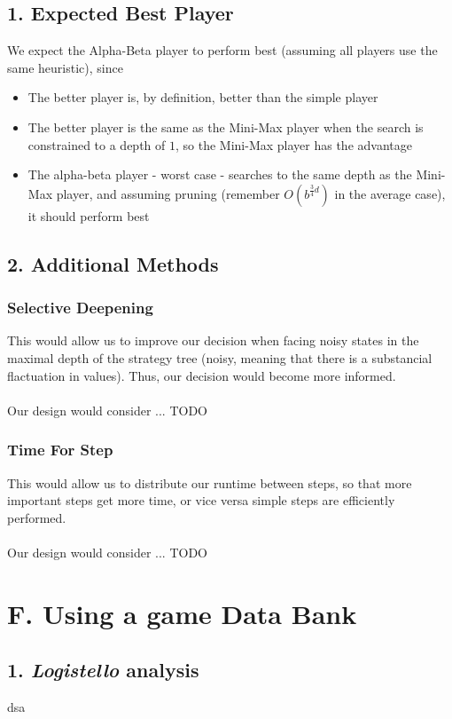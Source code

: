 \documentclass{article}
\begin{document}
\subsection*{1. Expected Best Player}
We expect the Alpha-Beta player to perform best (assuming all players use the same heuristic), since
\begin{itemize}
\item The better player is, by definition, better than the simple player
\item The better player is the same as the Mini-Max player when the search is constrained to a depth of $1$, so the Mini-Max player has the advantage
\item The alpha-beta player - worst case - searches to the same depth as the Mini-Max player, and assuming pruning (remember $O(b^{\frac{3}{4} d})$ in the average case), it should perform best
\end{itemize}

\subsection*{2. Additional Methods}
\subsubsection*{Selective Deepening}
This would allow us to improve our decision when facing noisy states in the maximal depth of the strategy tree (noisy, meaning that there is a substancial flactuation in values). Thus, our decision would become more informed. \\~\\
Our design would consider ... TODO

\subsubsection*{Time For Step}
This would allow us to distribute our runtime between steps, so that more important steps get more time, or vice versa simple steps are efficiently performed. \\~\\
Our design would consider ... TODO

\section*{F. Using a game Data Bank}
\subsection*{1. \emph{Logistello} analysis}
dsa
\end{document}
